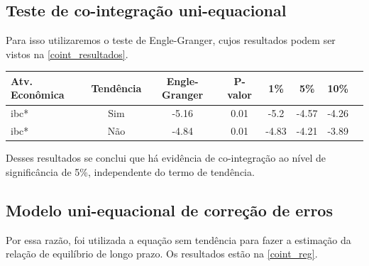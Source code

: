 \documentclass[a4paper,
               article,
               12pt,
               openany,
               oneside,
               english,
               brazil]{abntex2}
\numberwithin{equation}{section}
\begin{document}
    \subsection{Teste de co-integração uni-equacional}

    Para isso utilizaremos o teste de Engle-Granger, cujos resultados podem ser vistos na \autoref{coint_resultados}.

    \begin{table}[hbt]
        {%
            \begin{tabular}{lccccccc}
                \midrule
                Atv. Econômica & Tendência & Engle-Granger & P-valor & 1\% & 5\% & 10\% \\
                \midrule
                ibc* & Sim & -5.16 & 0.01 & -5.2 & -4.57 & -4.26 \\
                ibc* & Não & -4.84 & 0.01 & -4.83 & -4.21 & -3.89 \\
                \midrule
            \end{tabular}
            } 
            {}
    \end{table}

    Desses resultados se conclui que há evidência de co-integração ao nível de significância de 5\%, independente do termo de tendência.
    
    \subsection{Modelo uni-equacional de correção de erros}

    Por essa razão, foi utilizada a equação sem tendência para fazer a estimação da relação de equilíbrio de longo prazo. Os resultados estão na \autoref{coint_reg}.
\end{document}
